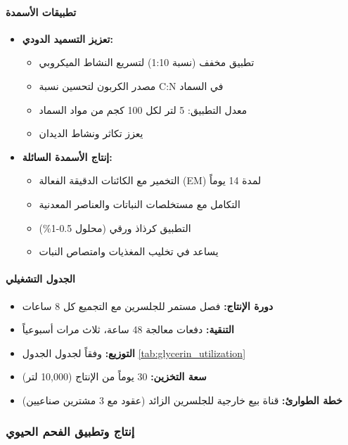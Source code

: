 \paragraph{تطبيقات الأسمدة}
\label{sec:glycerin_as_fertilizer}
\begin{itemize}
    \item \textbf{تعزيز التسميد الدودي:}
    \begin{itemize}
        \item تطبيق مخفف (نسبة 1:10) لتسريع النشاط الميكروبي
        \item مصدر الكربون لتحسين نسبة C:N في السماد
        \item معدل التطبيق: 5 لتر لكل 100 كجم من مواد السماد
        \item يعزز تكاثر ونشاط الديدان
    \end{itemize}
    
    \item \textbf{إنتاج الأسمدة السائلة:}
    \begin{itemize}
        \item التخمير مع الكائنات الدقيقة الفعالة (EM) لمدة 14 يوماً
        \item التكامل مع مستخلصات النباتات والعناصر المعدنية
        \item التطبيق كرذاذ ورقي (محلول 0.5-1\%)
        \item يساعد في تخليب المغذيات وامتصاص النبات
    \end{itemize}
\end{itemize}

\paragraph{الجدول التشغيلي}
\begin{itemize}
    \item \textbf{دورة الإنتاج:} فصل مستمر للجلسرين مع التجميع كل 8 ساعات
    \item \textbf{التنقية:} دفعات معالجة 48 ساعة، ثلاث مرات أسبوعياً
    \item \textbf{التوزيع:} وفقاً لجدول الجدول \ref{tab:glycerin_utilization}
    \item \textbf{سعة التخزين:} 30 يوماً من الإنتاج (10,000 لتر)
    \item \textbf{خطة الطوارئ:} قناة بيع خارجية للجلسرين الزائد (عقود مع 3 مشترين صناعيين)
\end{itemize}

\subsubsection{إنتاج وتطبيق الفحم الحيوي}
\label{sec:biochar_production}

